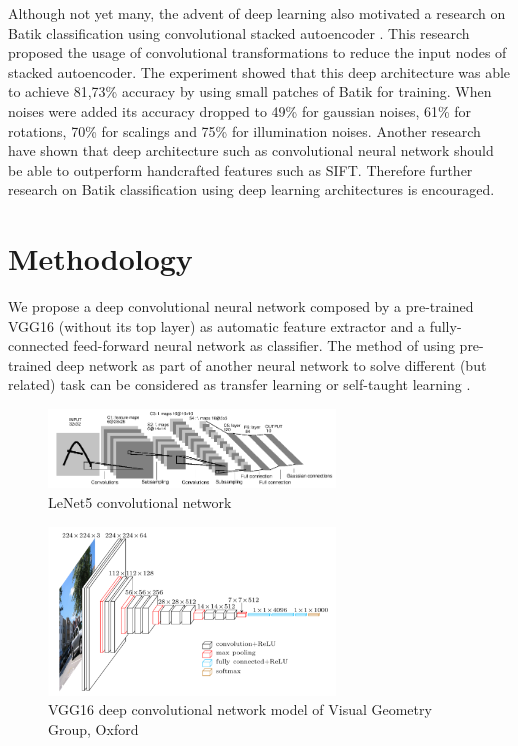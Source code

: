 \documentclass[conference]{IEEEtran}
\begin{document}
Although not yet many, the advent of deep learning also motivated a research on Batik classification using convolutional stacked autoencoder \cite{menzata2014sistem}. This research proposed the usage of convolutional transformations to reduce the input nodes of stacked autoencoder. The experiment showed that this deep architecture was able to achieve 81,73\% accuracy by using small patches of Batik for training. When noises were added its accuracy dropped to 49\% for gaussian noises, 61\% for rotations, 70\% for scalings and 75\% for illumination noises. Another research have shown that deep architecture such as convolutional neural network should be able to outperform handcrafted features such as SIFT\cite{fischer2014descriptor}. Therefore further research on Batik classification using deep learning architectures is encouraged.

\section{Methodology}

We propose a deep convolutional neural network composed by a pre-trained VGG16 (without its top layer) as automatic feature extractor and a fully-connected feed-forward neural network as classifier. The method of using pre-trained deep network as part of another neural network to solve different (but related) task can be considered as transfer learning or self-taught learning \cite{raina2007self}.

\begin{figure}[!t]
\centering
\includegraphics[width=3.0in]{lenet5}
\caption{LeNet5 convolutional network}
\label{fig_lenet5_convnet}
\end{figure}


\begin{figure}[!t]
\centering
\includegraphics[width=3.0in]{vgg16}
\caption{VGG16 deep convolutional network model of Visual Geometry Group, Oxford}
\label{fig_vgg16}
\end{figure}
\end{document}
